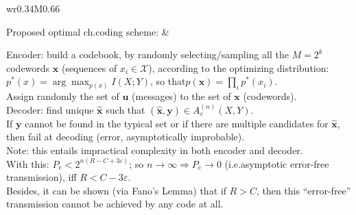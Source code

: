 \documentclass[10pt]{homework}
\newenvironment{mytable}
    { %
        \bgroup
        \centering
        \def\arraystretch{2.3}%
        \begin{longtable}{wr{0.34\textwidth}M{0.66\textwidth}}
    }
    { %
        \end{longtable}
        \egroup
    }
\newenvironment{mytextcol}
    { %
        \begin{minipage}[t]{0.6\textwidth}
    }
    { %
        \end{minipage}
    }
\begin{document}
\begin{mytable}
Proposed optimal ch.\@ coding scheme: &
\begin{mytextcol}
Encoder: build a codebook, by randomly selecting/sampling all the $M=2^k$ codewords $\bm x$ (sequences of $x_i\in \mathcal{X}$), according to the optimizing distribution:\\
\phantom{MMM}$\displaystyle p^*(x) = \arg\max_{p(x)} I(X;Y)$, so that\@ $\displaystyle p(\bm x) = \prod_i p^*(x_i)$.\\
Assign randomly the set of $\bm u$ (messages) to the set of $\bm x$ (codewords).
\\[4pt]
Decoder: find unique $\hat{\bm x}$ such that $(\hat{\bm x}, \bm y) \in A_\varepsilon^{(n)} (X,Y)$. \\If $\bm y$ cannot be found in the typical set or if there are multiple candidates for $\hat{\bm x}$, then fail at decoding (error, asymptotically improbable). 
\\[4pt] Note: this entails impractical complexity in both encoder and decoder.
\\[4pt]
With this: $P_e < 2^{n(R-C+3\varepsilon)}$; so $n\to\infty \Rightarrow P_e \to 0$ (i.e.\@ asymptotic error-free transmission), iff $R<C-3\varepsilon$. \\[4pt]
Besides, it can be shown (via Fano's Lemma) that if $R> C$, then this ``error-free'' transmission cannot be achieved by any code at all.
\end{mytextcol}
\end{mytable}
\end{document}
